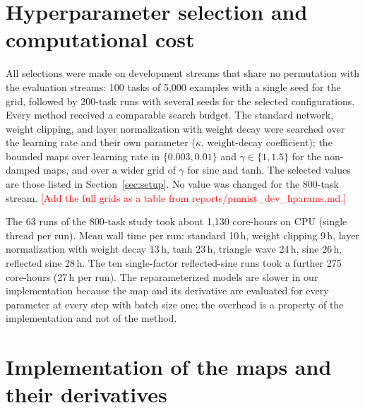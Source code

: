 \documentclass[11pt,a4paper]{article}
\newcommand{\todo}[1]{\textcolor{red}{[#1]}}
\begin{document}



\appendix
\section{Hyperparameter selection and computational cost}\label{app:hparams}

All selections were made on development streams that share no permutation with the evaluation streams: 100
tasks of 5{,}000 examples with a single seed for the grid, followed by 200-task runs with several seeds for the
selected configurations. Every method received a comparable search budget. The standard network, weight
clipping, and layer normalization with weight decay were searched over the learning rate and their own
parameter ($\kappa$, weight-decay coefficient); the bounded maps over learning rate in $\{0.003,0.01\}$ and
$\gamma\in\{1,1.5\}$ for the non-damped maps, and over a wider grid of $\gamma$ for sine and tanh. The selected
values are those listed in Section~\ref{sec:setup}. No value was changed for the 800-task stream.
\todo{Add the full grids as a table from reports/pmnist\_dev\_hparams.md.}

The 63 runs of the 800-task study took about 1{,}130 core-hours on CPU (single thread per run). Mean wall time
per run: standard 10\,h, weight clipping 9\,h, layer normalization with weight decay 13\,h, tanh 23\,h,
triangle wave 24\,h, sine 26\,h, reflected sine 28\,h. The ten single-factor reflected-sine runs took a further
275 core-hours (27\,h per run). The reparameterized models are slower in our
implementation because the map and its derivative are evaluated for every parameter at every step with batch
size one; the overhead is a property of the implementation and not of the method.

\section{Implementation of the maps and their derivatives}\label{app:impl}
\end{document}
